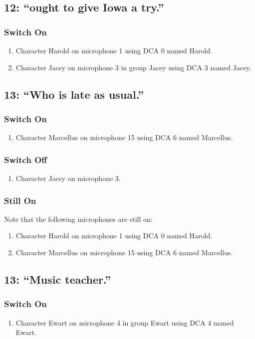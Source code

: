 \subsection* {12: ``ought to give Iowa a try.''}
\subsubsection* {Switch On}
\begin{enumerate}
\item Character Harold on microphone 1 using DCA 0 named Harold.
\item Character Jacey on microphone 3 in group Jacey using DCA 3 named Jacey.
\end{enumerate}
\subsection* {13: ``Who is late as usual.''}
\subsubsection* {Switch On}
\begin{enumerate}
\item Character Marcellus on microphone 15 using DCA 6 named Marcellus.
\end{enumerate}
\subsubsection* {Switch Off}
\begin{enumerate}
\item Character Jacey on microphone 3.
\end{enumerate}
\subsubsection* {Still On}
Note that the following microphones are still on:
\begin{enumerate}
\item Character Harold on microphone 1 using DCA 0 named Harold.
\item Character Marcellus on microphone 15 using DCA 6 named Marcellus.
\end{enumerate}
\subsection* {13: ``Music teacher.''}
\subsubsection* {Switch On}
\begin{enumerate}
\item Character Ewart on microphone 4 in group Ewart using DCA 4 named Ewart.
\end{enumerate}
